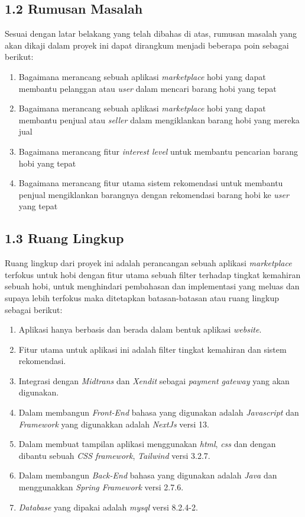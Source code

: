 \documentclass[a4paper]{article}
\begin{document}
\subsection*{1.2 Rumusan Masalah}

Sesuai dengan latar belakang yang telah dibahas di atas, rumusan masalah yang akan dikaji dalam proyek ini dapat dirangkum menjadi beberapa poin sebagai berikut:
\begin{enumerate}
    \item Bagaimana merancang sebuah aplikasi \textit{marketplace} hobi yang dapat membantu pelanggan atau \textit{user} dalam mencari barang hobi yang tepat
    \item Bagaimana merancang sebuah aplikasi \textit{marketplace} hobi yang dapat membantu penjual atau \textit{seller} dalam mengiklankan barang hobi yang mereka jual
    \item Bagaimana merancang fitur \textit{interest level} untuk membantu pencarian barang hobi yang tepat
    \item Bagaimana merancang fitur utama sistem rekomendasi untuk membantu penjual mengiklankan barangnya dengan rekomendasi barang hobi ke \textit{user} yang tepat
\end{enumerate}

\subsection*{1.3 Ruang Lingkup}
Ruang lingkup dari proyek ini adalah perancangan sebuah aplikasi \textit{marketplace} terfokus untuk hobi dengan fitur utama sebuah filter terhadap tingkat kemahiran sebuah hobi, untuk menghindari pembahasan dan implementasi yang meluas dan supaya lebih terfokus maka ditetapkan batasan-batasan atau ruang lingkup sebagai berikut:
\begin{enumerate}
    \item Aplikasi hanya berbasis dan berada dalam bentuk aplikasi \textit{website}.
    \item Fitur utama untuk aplikasi ini adalah filter tingkat kemahiran dan  sistem rekomendasi.
    \item Integrasi dengan \textit{Midtrans} dan \textit{Xendit} sebagai \textit{payment gateway} yang akan digunakan.
    \item Dalam membangun \textit{Front-End} bahasa yang digunakan adalah \textit{Javascript} dan \textit{Framework} yang digunakkan adalah \textit{NextJs} versi 13.
    \item Dalam membuat tampilan aplikasi menggunakan \textit{html}, \textit{css} dan dengan dibantu sebuah \textit{CSS framework}, \textit{Tailwind} versi 3.2.7.
    \item Dalam membangun \textit{Back-End} bahasa yang digunakan adalah \textit{Java} dan menggunakkan \textit{Spring Framework} versi 2.7.6.
    \item \textit{Database} yang dipakai adalah \textit{mysql} versi 8.2.4-2.
\end{enumerate}
\end{document}
